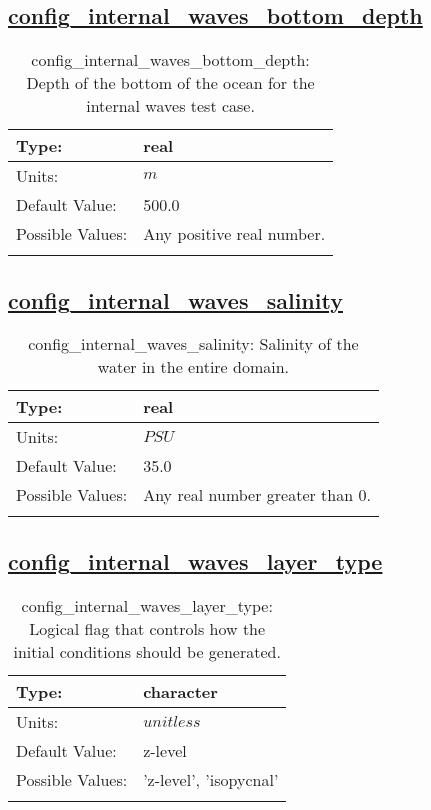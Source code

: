 \subsection[config\_internal\_waves\_bottom\_depth]{\hyperref[sec:nm_tab_internal_waves]{config\_internal\_waves\_bottom\_depth}}
\label{subsec:nm_sec_config_internal_waves_bottom_depth}
\begin{center}
\begin{longtable}{| p{2.0in} || p{4.0in} |}
    \hline
    Type: & real \\
    \hline
    Units: & $m$ \\
    \hline
    Default Value: & 500.0 \\
    \hline
    Possible Values: & Any positive real number. \\
    \hline
    \caption{config\_internal\_waves\_bottom\_depth: Depth of the bottom of the ocean for the internal waves test case.}
\end{longtable}
\end{center}
\subsection[config\_internal\_waves\_salinity]{\hyperref[sec:nm_tab_internal_waves]{config\_internal\_waves\_salinity}}
\label{subsec:nm_sec_config_internal_waves_salinity}
\begin{center}
\begin{longtable}{| p{2.0in} || p{4.0in} |}
    \hline
    Type: & real \\
    \hline
    Units: & $PSU$ \\
    \hline
    Default Value: & 35.0 \\
    \hline
    Possible Values: & Any real number greater than 0. \\
    \hline
    \caption{config\_internal\_waves\_salinity: Salinity of the water in the entire domain.}
\end{longtable}
\end{center}
\subsection[config\_internal\_waves\_layer\_type]{\hyperref[sec:nm_tab_internal_waves]{config\_internal\_waves\_layer\_type}}
\label{subsec:nm_sec_config_internal_waves_layer_type}
\begin{center}
\begin{longtable}{| p{2.0in} || p{4.0in} |}
    \hline
    Type: & character \\
    \hline
    Units: & $unitless$ \\
    \hline
    Default Value: & z-level \\
    \hline
    Possible Values: & 'z-level', 'isopycnal' \\
    \hline
    \caption{config\_internal\_waves\_layer\_type: Logical flag that controls how the initial conditions should be generated.}
\end{longtable}
\end{center}
